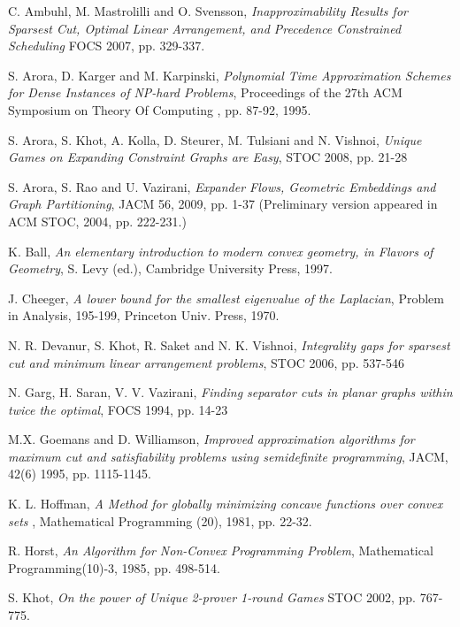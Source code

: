 \documentclass [11pt,a4paper]{article}
\begin{document}
\begin{thebibliography}{99}

 C. Ambuhl, M. Mastrolilli and O. Svensson, 
{\it Inapproximability Results for Sparsest Cut, Optimal Linear Arrangement, and Precedence Constrained Scheduling}
{\sf FOCS } 2007, pp. 329-337.

 S. Arora, D. Karger and M. Karpinski,
{\it Polynomial Time Approximation Schemes for Dense Instances of NP-hard Problems}, 
{\sf Proceedings of the 27th ACM Symposium on Theory
Of Computing }, pp. 87-92, 1995.

 S. Arora, S. Khot, A. Kolla, D. Steurer, M. Tulsiani and N. Vishnoi, 
{\it Unique Games on Expanding Constraint Graphs are Easy}, {\sf STOC} 2008, pp. 21-28

 S. Arora, S. Rao and U. Vazirani,
{\it Expander Flows, Geometric Embeddings and Graph Partitioning}, {\sf JACM} 56, 2009, pp. 1-37 
(Preliminary version appeared in {\sf ACM STOC}, 2004, pp. 222-231.)

 K. Ball, 
{\it An elementary introduction to modern convex geometry, in Flavors of Geometry}, S. Levy (ed.),
{\sf Cambridge University Press}, 1997.

 J. Cheeger, {\it A lower bound for the smallest eigenvalue of the Laplacian}, {\sf Problem in Analysis}, 195-199,
{\sf Princeton Univ. Press}, 1970.

 N. R. Devanur, S. Khot, R. Saket and N. K. Vishnoi, 
{\it Integrality gaps for sparsest cut and minimum linear arrangement problems}, STOC 2006, pp. 537-546

 N. Garg, H. Saran, V. V. Vazirani, {\it Finding separator cuts in planar graphs within twice the optimal}, {\sf FOCS} 1994, pp. 14-23

 M.X. Goemans and D. Williamson,
{\it Improved approximation algorithms for maximum cut and satisfiability
problems using semidefinite programming}, {\sf JACM}, 42(6) 1995, pp. 1115-1145.


 K. L. Hoffman, {\it A Method for globally minimizing concave functions over convex sets }, {\sf Mathematical Programming}
(20), 1981, pp. 22-32.



 R. Horst, {\it An Algorithm for Non-Convex Programming Problem}, 
{\sf Mathematical Programming}(10)-3, 1985, pp. 498-514.

 S. Khot, {\it On the power of Unique 2-prover 1-round Games} {\sf STOC } 2002, pp. 767-775.


\end{thebibliography}
\end{document}
